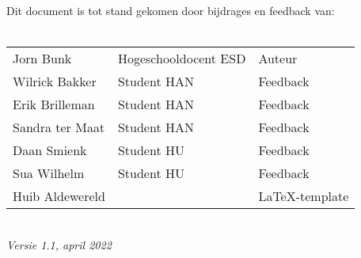 \documentclass[11pt,fleqn]{book} %
\begin{document}
\noindent Dit document is tot stand gekomen door bijdrages en feedback van:\\
\\[0.2cm]
\begin{tabular}{|p{3.5cm}|p{4cm}|p{4cm}|}
\hline
Jorn Bunk & Hogeschooldocent ESD & Auteur\\
Wilrick Bakker & Student HAN & Feedback \\
Erik Brilleman & Student HAN & Feedback\\
Sandra ter Maat & Student HAN & Feedback \\
Daan Smienk & Student HU & Feedback \\
Sua Wilhelm & Student HU & Feedback \\
Huib Aldewereld & & \LaTeX-template \\
\hline
\end{tabular}\\[1cm]

\noindent \textit{Versie 1.1, april 2022} %



\pagestyle{empty} %
\setcounter{tocdepth}{1}
\tableofcontents %


\pagestyle{fancy} %








 
 

\begin{appendices}
\renewcommand{\chaptername}{Appendix} %
\renewcommand{\appendixname}{} %
\addappheadtotoc %



\end{appendices}
\end{document}

